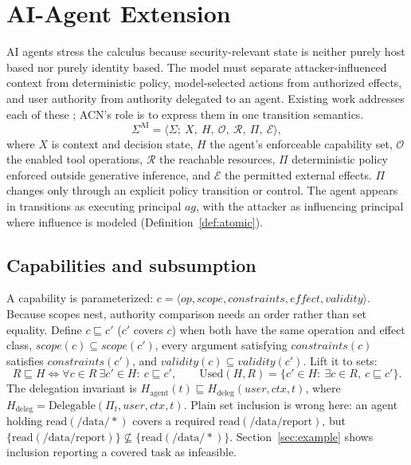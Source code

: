 \documentclass[11pt,letterpaper]{article}
\theoremstyle{definition}
\newcommand{\St}{\Sigma}
\begin{document}
\section{AI-Agent Extension}\label{sec:ai}

AI agents stress the calculus because security-relevant state is neither purely host based nor purely identity based. The model must separate attacker-influenced context from deterministic policy, model-selected actions from authorized effects, and user authority from authority delegated to an agent. Existing work addresses each of these \cite{taskshield,camel,progent,authgraph,xiong2026,skillguard}; ACN's role is to express them in one transition semantics.
\begin{equation}
\St^{\mathrm{AI}}=\langle\St;\ X,\ H,\ \mathcal{O},\ \mathcal{R},\ \Pi,\ \mathcal{E}\rangle,
\end{equation}
where $X$ is context and decision state, $H$ the agent's enforceable capability set, $\mathcal{O}$ the enabled tool operations, $\mathcal{R}$ the reachable resources, $\Pi$ deterministic policy enforced outside generative inference, and $\mathcal{E}$ the permitted external effects. $\Pi$ changes only through an explicit policy transition or control. The agent appears in transitions as executing principal $\mathit{ag}$, with the attacker as influencing principal where influence is modeled (Definition~\ref{def:atomic}).

\subsection{Capabilities and subsumption}\label{sec:authority}

A capability is parameterized: $c=\langle \mathit{op},\mathit{scope},\mathit{constraints},\mathit{effect},\mathit{validity}\rangle$. Because scopes nest, authority comparison needs an order rather than set equality. Define $c\sqsubseteq c'$ ($c'$ covers $c$) when both have the same operation and effect class, $\mathit{scope}(c)\subseteq\mathit{scope}(c')$, every argument satisfying $\mathit{constraints}(c)$ satisfies $\mathit{constraints}(c')$, and $\mathit{validity}(c)\subseteq\mathit{validity}(c')$. Lift it to sets:
\begin{equation}
R\sqsubseteq H\iff \forall c\in R\ \exists c'\in H:\ c\sqsubseteq c',\qquad \mathrm{Used}(H,R)=\{c'\in H:\ \exists c\in R,\ c\sqsubseteq c'\}.
\end{equation}
The delegation invariant is $H_{\mathrm{agent}}(t)\sqsubseteq H_{\mathrm{deleg}}(\mathit{user},\mathit{ctx},t)$, where $H_{\mathrm{deleg}}=\mathrm{Delegable}(\Pi_t,\mathit{user},\mathit{ctx},t)$. Plain set inclusion is wrong here: an agent holding $\mathrm{read}(/\mathrm{data}/*)$ covers a required $\mathrm{read}(/\mathrm{data}/\mathrm{report})$, but $\{\mathrm{read}(/\mathrm{data}/\mathrm{report})\}\not\subseteq\{\mathrm{read}(/\mathrm{data}/*)\}$. Section~\ref{sec:example} shows inclusion reporting a covered task as infeasible.
\end{document}
